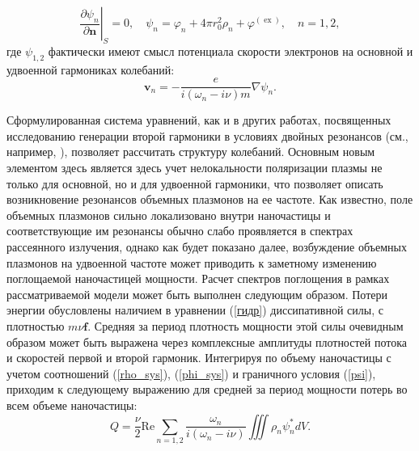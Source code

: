 \documentclass[12pt, a4paper]{article}
\renewcommand{\vec}{\mathbf}
\def \w {\omega}
\def \ph {\varphi}
\def \ex { \operatorname{ex}}
\newcommand{\dn}[1]{\left.\frac{\partial #1}{\partial \vec{n}}\right|_{ S}}
\begin{document}
\begin{equation} 
	\label{psi}
\dn{\psi_n}	= 0, \quad \psi_n = \ph_n + 4 \pi r_0^2 \rho_n + \ph^{(\ex)}, \quad n = 1,2,  
\end{equation}
где $\psi_{1,2}$ фактически имеют смысл потенциала скорости электронов на основной и удвоенной гармониках колебаний:
\begin{equation} 
	\label{v}
	\vec{v}_n = -\frac{e}{i(\w_n - i\nu)m} \nabla \psi_n.
\end{equation}

Сформулированная система уравнений, как и в других работах, посвященных исследованию генерации второй гармоники в условиях двойных резонансов (см., например, \cite{HuaGersten1986}), позволяет рассчитать структуру колебаний. Основным новым элементом здесь является здесь учет нелокальности поляризации плазмы не только для основной, но и для удвоенной гармоники, что позволяет описать возникновение резонансов объемных плазмонов на ее частоте. Как известно, поле объемных плазмонов сильно локализовано внутри наночастицы и соответствующие им резонансы обычно слабо проявляется в спектрах рассеянного излучения, однако как будет показано далее, возбуждение объемных плазмонов на удвоенной частоте может приводить к заметному изменению поглощаемой наночастицей мощности. Расчет спектров поглощения в рамках рассматриваемой модели может быть выполнен следующим образом. Потери энергии обусловлены наличием в уравнении (\ref{гидр}) диссипативной силы, с плотностью $m \nu \vec{f}$. Средняя за период плотность мощности этой силы очевидным образом может быть выражена через комплексные амплитуды плотностей потока и скоростей первой и второй гармоник. Интегрируя по объему наночастицы с учетом соотношений (\ref{rho_sys}), (\ref{phi_sys}) и граничного условия (\ref{psi}), приходим к следующему выражению для средней за период мощности потерь во всем объеме наночастицы: 
\begin{equation} 
	\label{Q}
	Q = \frac{\nu}{2}\mathrm{Re}  \sum_{n=1,2}\frac{\w_n}{i(\w_n - i \nu)}\iiint\rho_n \psi_n^* dV.
\end{equation}
\end{document}
